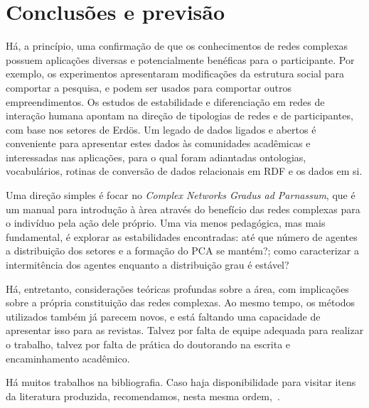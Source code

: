 \documentclass[a4paper,openright,12pt]{report} %
\begin{document}
\chapter{Conclusões e previsão}
Há, a princípio, uma confirmação de que os conhecimentos de redes complexas
possuem aplicações diversas e potencialmente benéficas para o participante.
Por exemplo, os experimentos apresentaram modificações da estrutura social para comportar a pesquisa, e podem ser usados para comportar outros empreendimentos. Os estudos de estabilidade e diferenciação em redes de interação humana apontam na direção de tipologias de redes e de participantes, com base nos setores de Erdös.
Um legado de dados ligados e abertos é conveniente para apresentar estes dados às comunidades acadêmicas e interessadas nas aplicações, para o qual foram adiantadas ontologias, vocabulários, rotinas de conversão de dados relacionais em RDF e os dados em si.

Uma direção simples
é focar no \emph{Complex Networks Gradus ad Parnassum},
que é um manual para introdução à àrea através do benefício 
das redes complexas para o indivíduo pela ação dele próprio.
Uma via menos pedagógica, mas mais fundamental, é
explorar as estabilidades encontradas: até que número de
agentes a distribuição dos setores e a formação do PCA se mantém?;
como caracterizar a intermitência dos agentes enquanto a distribuição
grau é estável?

Há, entretanto, considerações teóricas profundas sobre a área,
com implicações sobre a própria constituição das redes complexas.
Ao mesmo tempo, os métodos utilizados também já parecem novos,
e está faltando uma capacidade de apresentar isso para as revistas.
Talvez por falta de equipe adequada para realizar o trabalho,
talvez por falta de prática do doutorando na escrita e encaminhamento
acadêmico.

Há muitos trabalhos na bibliografia.
Caso haja disponibilidade para visitar itens da literatura
produzida, recomendamos, nesta mesma ordem,~\cite{timeS,pnud5,ensaioAA,gmane,fourHubs}.




\end{document}

